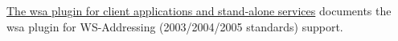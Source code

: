 
\begin{DoxyItemize}
\item \hyperlink{wsa__0}{The wsa plugin for client applications and stand-\/alone services} documents the wsa plugin for WS-\/Addressing (2003/2004/2005 standards) support. 
\end{DoxyItemize}